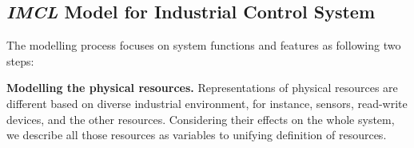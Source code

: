 \subsection{\emph{IMCL} Model for Industrial Control System}

The modelling process focuses on system functions and features as following two steps:
%
%


\textbf{Modelling the physical resources. }
Representations of physical resources are different based on diverse industrial environment, for instance, sensors, read-write devices, and the other resources. Considering their effects on the whole system, we describe all those resources as variables to unifying definition of resources.

